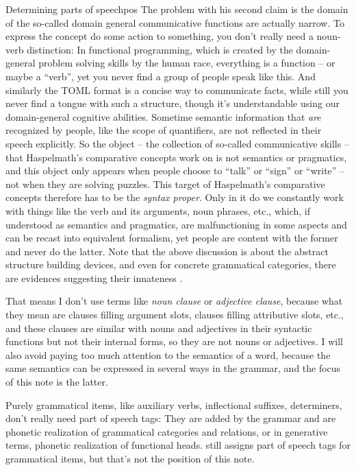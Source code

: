 \documentclass[UTF8, a4paper, oneside, scheme=plain]{ctexrep}
\newcommand*{\term}[1]{\emph{#1}}
\begin{document}
\begin{theorybox}{Determining parts of speech}{pos}
{        The problem with his second claim is the domain of 
        the so-called domain general communicative functions 
        are actually narrow.
        To express the concept do some action to something,
        you don't really need a noun-verb distinction:
        In functional programming, which is created by the domain-general problem solving skills by the human race,
        everything is a function -- or maybe a ``verb'',
        yet you never find a group of people speak like this.
        And similarly the TOML format is a concise way to communicate facts,
        while still you never find a tongue with such a structure,
        though it's understandable using our domain-general cognitive abilities.
        Sometime semantic information that \emph{are} recognized by people,
        like the scope of quantifiers, 
        are not reflected in their speech explicitly.
        So the object -- the collection of so-called communicative skills -- 
        that Haspelmath's comparative concepts work on 
        is not semantics or pragmatics,
        and this object only appears when people choose to ``talk'' or ``sign'' or ``write''
        -- not when they are solving puzzles.
        This target of Haspelmath's comparative concepts therefore has to be the \emph{syntax proper}.
        Only in it do we constantly work with things like the verb and its arguments,
        noun phrases, etc., 
        which, if understood as semantics and pragmatics,
        are malfunctioning in some aspects
        and can be recast into equivalent formalism,
        yet people are content with the former 
        and never do the latter.
        Note that the above discussion is about the abstract structure building devices,
        and even for concrete grammatical categories,
        there are evidences suggesting their innateness \citep{satik2022cartography}.
    }

    That means I don't use terms like \term{noun clause} or \term{adjective clause},
    because what they mean are clauses filling argument slots, 
    clauses filling attributive slots, etc.,
    and these clauses are similar with nouns and adjectives in their syntactic functions 
    but not their internal forms,
    so they are not nouns or adjectives.
    I will also avoid paying too much attention to the semantics of a word,
    because the same semantics can be expressed in several ways in the grammar,
    and the focus of this note is the latter.

    Purely grammatical items, like auxiliary verbs, inflectional suffixes, determiners,
    don't really need part of speech tags:
    They are added by the grammar and are phonetic realization of grammatical categories and relations,
    or in generative terms, phonetic realization of functional heads.
    \citet{cgel} still assigns part of speech tags for grammatical items,
    but that's not the position of this note.
\end{theorybox} 
\end{document}
